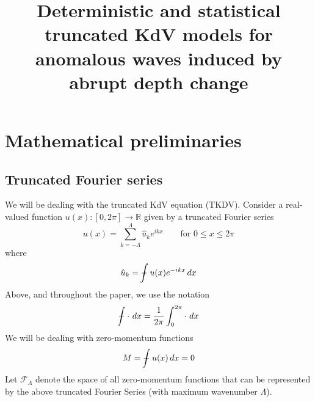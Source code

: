 \documentclass[12pt]{article}
\newcommand{\uhat}{\hat{u}}
\newcommand{\RR}{\mathbb{R}}
\newcommand{\Fspace}{\mathscr{F}_{\Lambda}}
\def\Xint#1{\mathchoice
   {\XXint\displaystyle\textstyle{#1}}%
   {\XXint\textstyle\scriptstyle{#1}}%
   {\XXint\scriptstyle\scriptscriptstyle{#1}}%
   {\XXint\scriptscriptstyle\scriptscriptstyle{#1}}%
   \!\int}
\def\XXint#1#2#3{{\setbox0=\hbox{$#1{#2#3}{\int}$}
     \vcenter{\hbox{$#2#3$}}\kern-.5\wd0}}
\def\dashint{\Xint-}
\newcommand{\intt}{\dashint}%
\newcommand{\dx}{\, dx}
\begin{document}
\title{Deterministic and statistical truncated KdV models for anomalous waves induced by abrupt depth change}
\author{}
\maketitle


\section{Mathematical preliminaries}

\subsection{Truncated Fourier series}

We will be dealing with the truncated KdV equation (TKDV). 
Consider a real-valued function $u(x): [0, 2\pi] \to \RR$ given by a truncated Fourier series
\begin{equation}
u(x) = \sum_{k= -\Lambda}^{\Lambda} \uhat_k e^{i k x}	\qquad \text{for } 0 \le x \le 2\pi
\end{equation}
where
\begin{equation}
\uhat_k = \intt u(x) e^{-i k x} \dx
\end{equation}
Above, and throughout the paper, we use the notation
\begin{equation}
\intt \cdot \, \dx  = \frac{1}{2\pi} \int_0^{2 \pi} \cdot \, \dx
\end{equation}
We will be dealing with zero-momentum functions
\begin{equation}
M = \intt u(x) \dx = 0
\end{equation}
Let $\Fspace$ denote the space of all zero-momentum functions that can be represented by the above truncated Fourier Series (with maximum wavenumber $\Lambda$).
\end{document}
